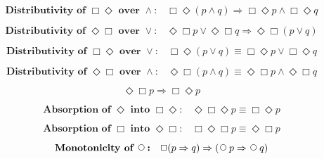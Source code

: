 \documentclass[fleqn, leqno]{article}
\newcommand{\impl}{\ensuremath{\Rightarrow}}        %
\newcommand{\Next}{\;\,\text{\raisebox{3.5pt}{\circle{6}}}}
\newcommand{\Event}{\Diamond}
\newcommand{\Always}{\Box}
\newcommand{\spacer}{\vspace{-30pt}}
\begin{document}
\spacer

\begin{equation}\label{E:distAlwaysEventAnd}
\textbf{Distributivity of $\Always\Event$ over $\land$:}\quad \Always\Event(p \land q) \impl \Always\Event p \land \Always\Event q
\end{equation}

\spacer

\begin{equation}\label{E:distEventAlwaysOr}
\textbf{Distributivity of $\Event\Always$ over $\lor$:}\quad \Event\Always p \lor \Event\Always q \impl \Event\Always (p \lor q)
\end{equation}

\spacer

\begin{equation}\label{E:distAlwaysEventOr}
\textbf{Distributivity of $\Always\Event$ over $\lor$:}\quad \Always\Event(p \lor q) \equiv \Always\Event p \lor \Always\Event q
\end{equation}

\spacer

\begin{equation}\label{E:distEventAlwaysAnd}
\textbf{Distributivity of $\Event\Always$ over $\land$:}\quad \Event\Always(p \land q) \equiv \Event\Always p \land \Event\Always q
\end{equation}

\spacer

\begin{equation}\label{E:eventAlwaysImp}
\Event\Always p \impl \Always\Event p
\end{equation}

\pagebreak

\begin{equation}\label{E:absEvent}
\textbf{Absorption of $\Event$ into $\Always\Event$:}\quad \Event\Always\Event p \equiv \Always\Event p
\end{equation}

\spacer

\begin{equation}\label{E:absAlways}
\textbf{Absorption of $\Always$ into $\Event\Always$:}\quad \Always\Event\Always p \equiv \Event\Always p
\end{equation}

\spacer

\begin{equation}\label{E:alwaysImpNexts}
\textbf{Monotonicity of $\Next$:}\quad \Always (p \impl q) \impl (\Next p \impl \Next q)
\end{equation}
\end{document}
